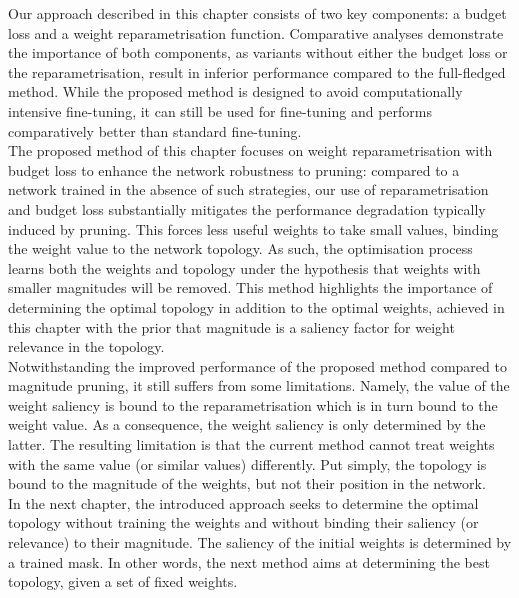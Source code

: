 Our approach described in this chapter consists of two key components: a budget
loss and a weight reparametrisation function. Comparative analyses demonstrate
the importance of both components, as variants without either the budget loss or
the reparametrisation, result in inferior performance compared to the
full-fledged method. While the proposed method is designed to avoid
computationally intensive fine-tuning, it can still be used for fine-tuning and
performs comparatively better than standard fine-tuning.\\

The proposed method of this chapter focuses on weight reparametrisation with
budget loss to enhance the network robustness to pruning: compared to a network
trained in the absence of such strategies, our use of reparametrisation and
budget loss substantially mitigates the performance degradation typically
induced by pruning. This forces less useful weights to take small values,
binding the weight value to the network topology. As such, the optimisation
process learns both the weights and topology under the hypothesis that weights
with smaller magnitudes will be removed. This method highlights the importance
of determining the optimal topology in addition to the optimal weights, achieved
in this chapter with the prior that magnitude is a saliency factor for weight
relevance in the topology.\\

Notwithstanding the improved performance of the proposed method compared to
magnitude pruning, it still suffers from some limitations. Namely, the value of
the weight saliency is bound to the reparametrisation which is in turn bound to
the weight value. As a consequence, the weight saliency is only determined by
the latter. The resulting limitation is that the current method cannot treat
weights with the same value (or similar values) differently. Put simply, the
topology is bound to the magnitude of the weights, but not their position in the
network.\\

In the next chapter, the introduced approach seeks to determine the optimal
topology without training the weights and without binding their saliency (or
relevance) to their magnitude. The saliency of the initial weights is determined
by a trained mask. In other words, the next method aims at determining the best
topology, given a set of fixed weights.\\

